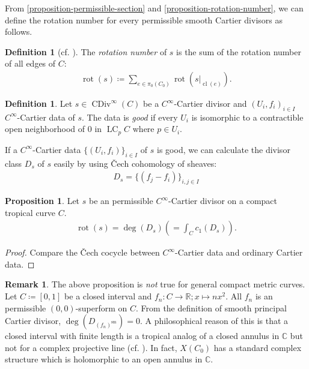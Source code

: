 \documentclass[a4paper,dvipdfmx,reqno,12pt]{amsart}
\theoremstyle{definition}
\newtheorem{definition}[theorem]{Definition}
\newtheorem{proposition}[theorem]{Proposition}
\newtheorem{remark}[theorem]{Remark}
\newcommand{\deq}{\coloneqq}
\newcommand{\opn}[1]{\operatorname{#1}}
\numberwithin{equation}{section}
\begin{document}
From \cref{proposition-permissible-section} and \cref{proposition-rotation-number}, we can define the 
rotation number for every permissible smooth 
Cartier divisors as follows.
\begin{definition}[{cf. \cite{auroux2022lagrangian}}]
The \emph{rotation number} of $s$ is the sum of
the rotation number of all edges of $C$: 
\begin{align}
\opn{rot}(s)\deq \sum_{e\in \pi_0(C_0)}
\opn{rot}(s|_{\opn{cl}(e)}).
\end{align}

\end{definition}

\begin{definition}
Let $s\in \opn{CDiv}^{\infty}(C)$ be a $C^{\infty}$-Cartier
divisor and $(U_i,f_i)_{i\in I}$ $C^{\infty}$-Cartier data
of $s$. The data is \emph{good} if 
every $U_i$ is isomorphic to a contractible open 
neighborhood of $0$ in $\opn{LC}_{p}C$ where 
$p\in U_i$.
\end{definition}
If a $C^{\infty}$-Cartier data $\{(U_i,f_i)\}_{i\in I}$ of $s$ 
is good,
we can calculate the divisor class $D_s$ of $s$ easily
by using \v{C}ech cohomology of sheaves:
\begin{align}
D_s=\{(f_j-f_i)\}_{i,j\in I}
\end{align}

\begin{proposition}
Let $s$ be an permissible $C^{\infty}$-Cartier divisor on
a compact tropical curve $C$.
\label{equation-rotation-number}
\begin{align}
\opn{rot}(s)=\opn{deg}(D_s)(=\int_{C} c_1(D_s)).
\end{align}
\end{proposition}

\begin{proof}
Compare the \v{C}ech cocycle between $C^{\infty}$-Cartier data and ordinary Cartier data.
\end{proof}

\begin{remark}
\label{remark-rotation-closed-interval} 
The above proposition 
is \emph{not} true for general compact metric curves.
Let $C\deq [0,1]$ be a closed interval
and $f_n\colon C\to \mathbb{R};x \mapsto nx^{2}$.
All $f_n$ is an permissible $(0,0)$-superform on $C$.
From the definition of smooth principal Cartier divisor,
$\opn{deg}(D_{(f_n)^{\mathrm{sm}}})=0$. 
A philosophical reason of this is that
a closed interval with finite length is a tropical
analog of a closed annulus in $\mathbb{C}$ but not for
a complex projective line (cf. 
\cite[Definition 3.7]{MR3903579}). In fact, $X(C_0)$ 
has a standard complex structure which is holomorphic to
an open annulus in $\mathbb{C}$.
\end{remark}
\end{document}
